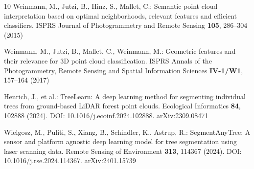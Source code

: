 \documentclass[runningheads]{llncs}
\begin{document}
\begin{thebibliography}{10}
Weinmann, M., Jutzi, B., Hinz, S., Mallet, C.:
Semantic point cloud interpretation based on optimal neighborhoods, relevant features and efficient classifiers.
ISPRS Journal of Photogrammetry and Remote Sensing \textbf{105}, 286--304 (2015)

Weinmann, M., Jutzi, B., Mallet, C., Weinmann, M.:
Geometric features and their relevance for 3D point cloud classification.
ISPRS Annals of the Photogrammetry, Remote Sensing and Spatial Information Sciences \textbf{IV-1/W1}, 157--164 (2017)

Henrich, J., et al.:
TreeLearn: A deep learning method for segmenting individual trees from ground-based LiDAR forest point clouds.
Ecological Informatics \textbf{84}, 102888 (2024).
DOI: 10.1016/j.ecoinf.2024.102888. arXiv:2309.08471

Wielgosz, M., Puliti, S., Xiang, B., Schindler, K., Astrup, R.:
SegmentAnyTree: A sensor and platform agnostic deep learning model for tree segmentation using laser scanning data.
Remote Sensing of Environment \textbf{313}, 114367 (2024).
DOI: 10.1016/j.rse.2024.114367. arXiv:2401.15739

\end{thebibliography}
\end{document}
